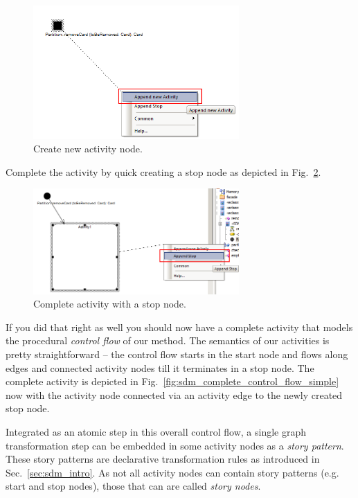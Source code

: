 \begin{figure}[htp]
\begin{center}
  \includegraphics[width=0.7\textwidth]{pics/sdmBilder/removeCard/sdm04RAW}
  \caption{Create new activity node.}  
  \label{fig:sdm_new_activity_node}
\end{center}
\end{figure}

Complete the activity by quick creating a stop node as depicted in
Fig.~\ref{fig:sdm_stop_node}.

\begin{figure}[htp]
\begin{center}
  \includegraphics[width=0.7\textwidth]{pics/sdmBilder/removeCard/sdm05RAW}
  \caption{Complete activity with a stop node.}  
  \label{fig:sdm_stop_node}
\end{center}
\end{figure}

If you did that right as well you should now have a complete activity that
models the procedural \emph{control flow} of our method.  The semantics of our
activities is pretty straightforward -- the control flow starts in the start
node and flows along edges and connected activity nodes till it terminates in a
stop node.  The complete activity is depicted in
Fig.~\ref{fig:sdm_complete_control_flow_simple} now with the activity node
connected via an activity edge to the newly created stop node.

Integrated as an atomic step in this overall control flow, a single graph
transformation step can be embedded in some activity nodes as a \emph{story
pattern}.  These story patterns are declarative transformation rules as introduced in
Sec.~\ref{sec:sdm_intro}.  As not all activity nodes can contain story
patterns (e.g. start and stop nodes), those that can are called \emph{story
nodes}.


